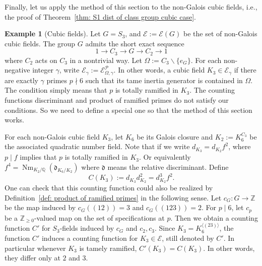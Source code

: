 \documentclass{amsart}
\numberwithin{equation}{section}
\theoremstyle{plain}
\theoremstyle{definition}
\newtheorem{example}[theorem]{Example}
\theoremstyle{remark}
\begin{document}
Finally, let us apply the method of this section to the non-Galois cubic fields, i.e., the proof of Theorem~\ref{thm: S1 dist of class group cubic case}.
\begin{example}[Cubic fields]
	Let $G=S_3$, and $\mathcal{E}:=\mathcal{E}(G)$ be the set of non-Galois cubic fields.
	The group $G$ admits the short exact sequence
	\begin{equation*}
		1\to C_3\to G\to C_2\to1
	\end{equation*}
	where $C_2$ acts on $C_3$ in a nontrivial way.
	Let $\Omega:=C_3\backslash\{e_G\}$.
	For each non-negative integer $\gamma$, write $\mathcal{E}_{\gamma}:=\mathcal{E}_{\Omega,\gamma}^{\mathcal{P}}$.
	In other words, a cubic field $K_3\in\mathcal{E}_{\gamma}$ if there are exactly $\gamma$ primes $p\nmid6$ such that its tame inertia generator is contained in $\Omega$.
    The condition simply means that $p$ is totally ramified in $K_3$.
	The counting functions discriminant and product of ramified primes do not satisfy our conditions.
	So we need to define a special one so that the method of this section works.
	
	For each non-Galois cubic field $K_3$, let $K_6$ be its Galois closure and $K_2:=K_6^{C_3}$ be the associated quadratic number field.
	Note that if we write $d_{K_3}=d_{K_2}f^2$, where $p\mid f$ implies that $p$ is totally ramified in $K_3$.
	Or equivalently $f^4=\operatorname{Nm}_{K_2/\mathbb{Q}}(\mathfrak{d}_{K_6/K_2})$ where $\mathfrak{d}$ means the relative discriminant.
	Define
	\begin{equation*}
		C(K_3):= d_{K_3}d_{K_2}^2= d_{K_2}^3f^2.
	\end{equation*}
	One can check that this counting function could also be realized by Definition~\ref{def: product of ramified primes} in the following sense.
	Let $c_G:G\to\mathbb{Z}$ be the map induced by $c_G((12))=3$ and $c_G((123))=2$.
	For $p\mid6$, let $c_p$ be a $\mathbb{Z}_{\geq0}$-valued map on the set of specifications at $p$.
	Then we obtain a counting function $C'$ for $S_3$-fields induced by $c_G$ and $c_2,c_3$.
	Since $K_3=K_6^{\langle(23)\rangle}$, the function $C'$ induces a counting function for $K_3\in\mathcal{E}$, still denoted by $C'$.
	In particular whenever $K_3$ is tamely ramified, $C'(K_3)=C(K_3)$.
	In other words, they differ only at $2$ and $3$.
	

\end{example}
\end{document}
